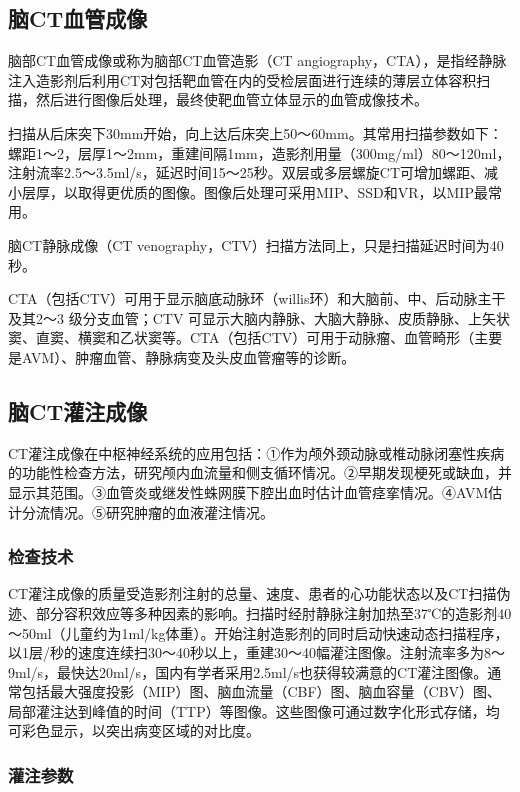 \subsection{脑CT血管成像}

脑部CT血管成像或称为脑部CT血管造影（CT
angiography，CTA），是指经静脉注入造影剂后利用CT对包括靶血管在内的受检层面进行连续的薄层立体容积扫描，然后进行图像后处理，最终使靶血管立体显示的血管成像技术。

扫描从后床突下30mm开始，向上达后床突上50～60mm。其常用扫描参数如下：螺距1～2，层厚1～2mm，重建间隔1mm，造影剂用量（300mg/ml）80～120ml，注射流率2.5～3.5ml/s，延迟时间15～25秒。双层或多层螺旋CT可增加螺距、减小层厚，以取得更优质的图像。图像后处理可采用MIP、SSD和VR，以MIP最常用。

脑CT静脉成像（CT venography，CTV）扫描方法同上，只是扫描延迟时间为40秒。

CTA（包括CTV）可用于显示脑底动脉环（willis环）和大脑前、中、后动脉主干及其2～3
级分支血管；CTV
可显示大脑内静脉、大脑大静脉、皮质静脉、上矢状窦、直窦、横窦和乙状窦等。CTA（包括CTV）可用于动脉瘤、血管畸形（主要是AVM）、肿瘤血管、静脉病变及头皮血管瘤等的诊断。

\subsection{脑CT灌注成像}

CT灌注成像在中枢神经系统的应用包括：①作为颅外颈动脉或椎动脉闭塞性疾病的功能性检查方法，研究颅内血流量和侧支循环情况。②早期发现梗死或缺血，并显示其范围。③血管炎或继发性蛛网膜下腔出血时估计血管痉挛情况。④AVM估计分流情况。⑤研究肿瘤的血液灌注情况。

\subsubsection{检查技术}

CT灌注成像的质量受造影剂注射的总量、速度、患者的心功能状态以及CT扫描伪迹、部分容积效应等多种因素的影响。扫描时经肘静脉注射加热至37℃的造影剂40～50ml（儿童约为1ml/kg体重）。开始注射造影剂的同时启动快速动态扫描程序，以1层/秒的速度连续扫30～40秒以上，重建30～40幅灌注图像。注射流率多为8～9ml/s，最快达20ml/s，国内有学者采用2.5ml/s也获得较满意的CT灌注图像。通常包括最大强度投影（MIP）图、脑血流量（CBF）图、脑血容量（CBV）图、局部灌注达到峰值的时间（TTP）等图像。这些图像可通过数字化形式存储，均可彩色显示，以突出病变区域的对比度。

\subsubsection{灌注参数}


